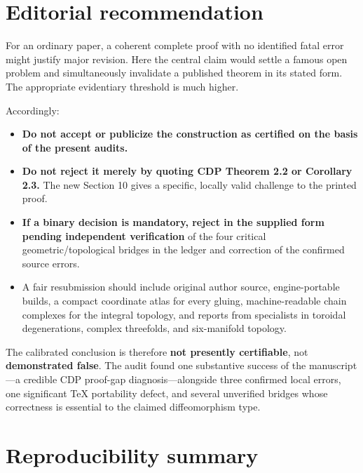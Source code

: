 \documentclass[11pt]{article}
\newcommand{\status}[1]{\textbf{#1}}
\begin{document}
\section{Editorial recommendation}

For an ordinary paper, a coherent complete proof with no identified fatal error might justify major revision. Here the central claim would settle a famous open problem and simultaneously invalidate a published theorem in its stated form. The appropriate evidentiary threshold is much higher.

Accordingly:

\begin{itemize}
\item \textbf{Do not accept or publicize the construction as certified on the basis of the present audits.}
\item \textbf{Do not reject it merely by quoting CDP Theorem 2.2 or Corollary 2.3.} The new Section 10 gives a specific, locally valid challenge to the printed proof.
\item \textbf{If a binary decision is mandatory, reject in the supplied form pending independent verification} of the four critical geometric/topological bridges in the ledger and correction of the confirmed source errors.
\item A fair resubmission should include original author source, engine-portable builds, a compact coordinate atlas for every gluing, machine-readable chain complexes for the integral topology, and reports from specialists in toroidal degenerations, complex threefolds, and six-manifold topology.
\end{itemize}

The calibrated conclusion is therefore \status{not presently certifiable}, not \status{demonstrated false}. The audit found one substantive success of the manuscript---a credible CDP proof-gap diagnosis---alongside three confirmed local errors, one significant \TeX{} portability defect, and several unverified bridges whose correctness is essential to the claimed diffeomorphism type.

\section{Reproducibility summary}
\end{document}
